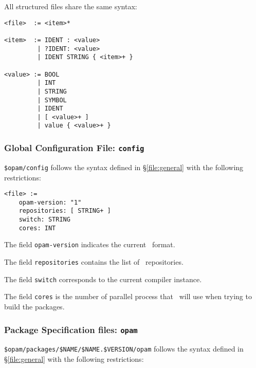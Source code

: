 \documentclass[a4paper,10pt]{article}
\begin{document}
All structured files share the same syntax:

{\small
\begin{Verbatim}[frame=single]
<file>  := <item>*

<item>  := IDENT : <value>
         | ?IDENT: <value>
         | IDENT STRING { <item>+ }

<value> := BOOL
         | INT
         | STRING
         | SYMBOL
         | IDENT
         | [ <value>+ ]
         | value { <value>+ }
\end{Verbatim}
}

\subsubsection{Global Configuration File: {\tt config}}
\label{file:config}

\verb+$opam/config+ follows the syntax defined in \S\ref{file:general} with
the following restrictions:

{\small
\begin{Verbatim}[frame=single]
<file> :=
    opam-version: "1"
    repositories: [ STRING+ ]
    switch: STRING
    cores: INT
\end{Verbatim}
}

The field {\tt opam-version} indicates the current \OPAM\ format.

The field {\tt repositories} contains the list of \OPAM\ repositories.

The field {\tt switch} corresponds to the current compiler instance.

The field {\tt cores} is the number of parallel process that
\OPAM\ will use when trying to build the packages.

\subsubsection{Package Specification files: {\tt opam}}
\label{file:opam}

\verb+$opam/packages/$NAME/$NAME.$VERSION/opam+ follows the syntax defined in
\S\ref{file:general} with the following restrictions:
\end{document}
